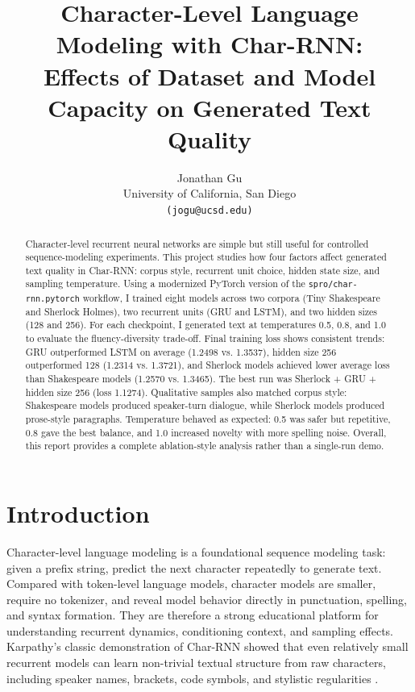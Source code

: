 \documentclass[10pt,twocolumn,letterpaper]{article}
\title{\textbf{Character-Level Language Modeling with Char-RNN:}\\
\textbf{Effects of Dataset and Model Capacity on Generated Text Quality}}
\author{
Jonathan Gu\\
University of California, San Diego\\
\texttt{(jogu@ucsd.edu)}
}
\date{}
\begin{document}
\maketitle

\begin{abstract}
Character-level recurrent neural networks are simple but still useful for controlled sequence-modeling experiments. This project studies how four factors affect generated text quality in Char-RNN: corpus style, recurrent unit choice, hidden state size, and sampling temperature. Using a modernized PyTorch version of the \texttt{spro/char-rnn.pytorch} workflow, I trained eight models across two corpora (Tiny Shakespeare and Sherlock Holmes), two recurrent units (GRU and LSTM), and two hidden sizes (128 and 256). For each checkpoint, I generated text at temperatures 0.5, 0.8, and 1.0 to evaluate the fluency-diversity trade-off. Final training loss shows consistent trends: GRU outperformed LSTM on average (1.2498 vs. 1.3537), hidden size 256 outperformed 128 (1.2314 vs. 1.3721), and Sherlock models achieved lower average loss than Shakespeare models (1.2570 vs. 1.3465). The best run was Sherlock + GRU + hidden size 256 (loss 1.1274). Qualitative samples also matched corpus style: Shakespeare models produced speaker-turn dialogue, while Sherlock models produced prose-style paragraphs. Temperature behaved as expected: 0.5 was safer but repetitive, 0.8 gave the best balance, and 1.0 increased novelty with more spelling noise. Overall, this report provides a complete ablation-style analysis rather than a single-run demo.
\end{abstract}

\section{Introduction}
Character-level language modeling is a foundational sequence modeling task: given a prefix string, predict the next character repeatedly to generate text. Compared with token-level language models, character models are smaller, require no tokenizer, and reveal model behavior directly in punctuation, spelling, and syntax formation. They are therefore a strong educational platform for understanding recurrent dynamics, conditioning context, and sampling effects. Karpathy's classic demonstration of Char-RNN showed that even relatively small recurrent models can learn non-trivial textual structure from raw characters, including speaker names, brackets, code symbols, and stylistic regularities \cite{karpathy2015}.
\end{document}
